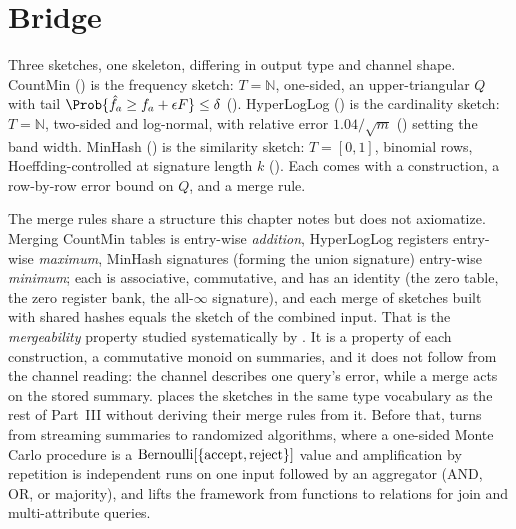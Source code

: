 %

\section{Bridge}
\label{sec:ch10-bridge}

Three sketches, one skeleton, differing in output type and
channel shape. CountMin () is the
frequency sketch: $T = \mathbb{N}$,
one-sided, an upper-triangular $Q$ with tail $\Prob{\hat f_a \ge f_a + \epsilon
F} \le \delta$ (). HyperLogLog ()
is the cardinality sketch: $T = \mathbb{N}$, two-sided and log-normal, with
relative error $1.04/\sqrt{m}$ () setting the band
width. MinHash () is the similarity sketch: $T = [0,1]$,
binomial rows, Hoeffding-controlled at signature length $k$
(). Each comes with a construction, a row-by-row error
bound on $Q$, and a merge rule.

The merge rules share a structure this chapter notes but does not axiomatize.
Merging CountMin tables is entry-wise \emph{addition}, HyperLogLog registers
entry-wise \emph{maximum}, MinHash signatures (forming the union signature)
entry-wise \emph{minimum}; each is associative, commutative, and has an identity
(the zero table, the zero register bank, the all-$\infty$ signature), and each
merge of sketches built with shared hashes equals the sketch of the combined
input. That is the \emph{mergeability} property studied systematically by
\textcite{agarwal-et-al-2013}. It is a property of each construction, a
commutative monoid on summaries, and it does not follow from the channel
reading: the channel describes one query's error, while a merge acts on the
stored summary.  places the sketches in the same type
vocabulary as the rest of Part~III without deriving their merge rules from it.
Before that,  turns from streaming summaries to
randomized algorithms, where a one-sided Monte Carlo
procedure is a
$\mathrm{Bernoulli}[\{\text{accept}, \text{reject}\}]$ value and amplification by
repetition is independent runs on one input followed by an aggregator (AND, OR,
or majority), and  lifts the framework from
functions to relations for join and multi-attribute queries.
